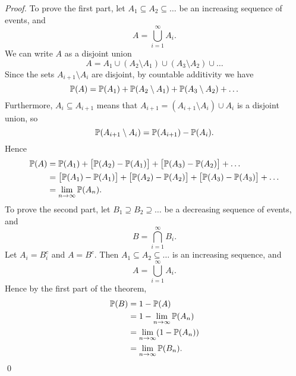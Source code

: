 \begin{proof}
To prove the first part, let $A_1\subseteq A_2\subseteq \ldots$ be an increasing sequence of events, and 
\[
A=\bigcup_{i=1}^{\infty} A_i.
\]
We can write $A$ as a disjoint union
\[
A = A_1 \cup (A_2\setminus A_1) \cup (A_3\setminus A_2) \cup \ldots
\]
Since the sets $A_{i+1}\setminus A_i$ are disjoint, by countable additivity we have
\[
\mathbb{P}(A) = \mathbb{P}(A_1) + \mathbb{P}(A_2\setminus A_1) + \mathbb{P}(A_3\setminus A_2) + \ldots
\]
Furthermore, $A_i\subseteq A_{i+1}$ means that $A_{i+1}=(A_{i+1}\setminus A_i)\cup A_i$ is a disjoint union, so
\[
\mathbb{P}(A_{i+1}\setminus A_i)=\mathbb{P}(A_{i+1})-\mathbb{P}(A_i).
\]
Hence
\begin{align*}
\mathbb{P}(A) 
	& = \mathbb{P}(A_1) + \big[\mathbb{P}(A_2) - \mathbb{P}(A_1)\big] + \big[\mathbb{P}(A_3) - \mathbb{P}(A_2)\big] + \ldots \\
	& = \big[\mathbb{P}(A_1) - \mathbb{P}(A_1)\big] + \big[\mathbb{P}(A_2) - \mathbb{P}(A_2)\big] + \big[\mathbb{P}(A_3) - \mathbb{P}(A_3)\big] + \ldots \\
	& = \lim_{n\to\infty} \mathbb{P}(A_n).
\end{align*}
\break %
To prove the second part, let $B_1\supseteq B_2\supseteq \ldots$ be a decreasing sequence of events, and 
\[
B=\bigcap_{i=1}^{\infty} B_i.
\]
Let $A_i=B^c_i$ and $A=B^c$. 
\spar
Then $A_1\subseteq A_2\subseteq \ldots$ is an increasing sequence, and 
\[
A=\bigcup_{i=1}^{\infty} A_i.
\]
Hence by the first part of the theorem,
\begin{align*}
\mathbb{P}(B) 
	& = 1 - \mathbb{P}(A) \\
	& = 1 - \lim_{n\to\infty} \mathbb{P}(A_n) \\
	& = \lim_{n\to\infty} (1-\mathbb{P}(A_n)) \\
	& = \lim_{n\to\infty} \mathbb{P}(B_n).
\end{align*}
\qed
\end{proof}

%
%

